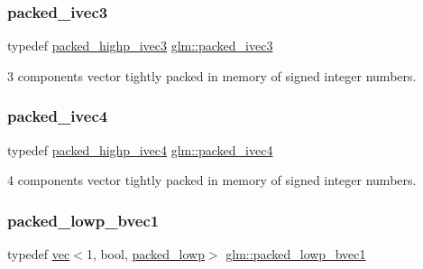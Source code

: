 \subsubsection{\texorpdfstring{packed\+\_\+ivec3}{packed\_ivec3}}
{\footnotesize\ttfamily typedef \mbox{\hyperlink{group__gtc__type__aligned_ga56b9f0123506edc416bbcf957d3ce678}{packed\+\_\+highp\+\_\+ivec3}} \mbox{\hyperlink{group__gtc__type__aligned_gae3121f35a569fd14475ff5f4d28bd98e}{glm\+::packed\+\_\+ivec3}}}



3 components vector tightly packed in memory of signed integer numbers. 

\mbox{\label{group__gtc__type__aligned_gaf87b2eccca075255f5ed368dfb1ecc31}} 
\subsubsection{\texorpdfstring{packed\+\_\+ivec4}{packed\_ivec4}}
{\footnotesize\ttfamily typedef \mbox{\hyperlink{group__gtc__type__aligned_gabf988b7dc66612bc1d4c9ce44d5b5642}{packed\+\_\+highp\+\_\+ivec4}} \mbox{\hyperlink{group__gtc__type__aligned_gaf87b2eccca075255f5ed368dfb1ecc31}{glm\+::packed\+\_\+ivec4}}}



4 components vector tightly packed in memory of signed integer numbers. 

\mbox{\label{group__gtc__type__aligned_gab43c5df4bb326006091ee3489bc1c367}} 
\subsubsection{\texorpdfstring{packed\+\_\+lowp\+\_\+bvec1}{packed\_lowp\_bvec1}}
{\footnotesize\ttfamily typedef \mbox{\hyperlink{structglm_1_1vec}{vec}}$<$1, bool, \mbox{\hyperlink{namespaceglm_a36ed105b07c7746804d7fdc7cc90ff25ac36a4bd74559be2c0b65bc48e5953b8b}{packed\+\_\+lowp}}$>$ \mbox{\hyperlink{group__gtc__type__aligned_gab43c5df4bb326006091ee3489bc1c367}{glm\+::packed\+\_\+lowp\+\_\+bvec1}}}



